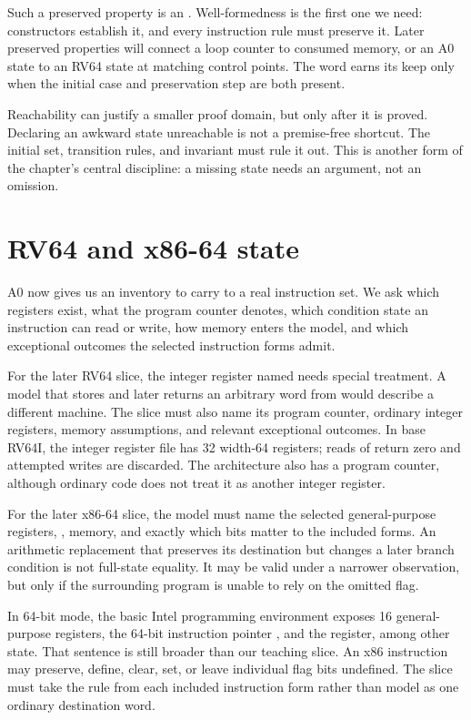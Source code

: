 Such a preserved property is an . Well-formedness is the first one
we need: constructors establish it, and every instruction rule must preserve
it. Later preserved properties will connect a loop counter to consumed memory, or an A0
state to an RV64 state at matching control points. The word earns its keep
only when the initial case and preservation step are both present.

Reachability can justify a smaller proof domain, but only after it is proved.
Declaring an awkward state unreachable is not a premise-free shortcut. The
initial set, transition rules, and invariant must rule it out. This is another
form of the chapter's central discipline: a missing state needs an argument,
not an omission.

\section{RV64 and x86-64 state}
\label{sec:paired-state}

A0 now gives us an inventory to carry to a real instruction set. We ask which
registers exist, what the program counter denotes, which condition state an
instruction can read or write, how memory enters the model, and which
exceptional outcomes the selected instruction forms admit.

For the later RV64 slice, the integer register named  needs special
treatment. A model that stores and later returns an arbitrary word from
 would describe a different machine. The slice must also name its
program counter, ordinary integer registers, memory assumptions, and relevant
exceptional outcomes. In base RV64I, the integer register file has 32
width-64 registers; reads of  return zero and attempted writes are
discarded. The architecture also has a program counter, although
ordinary code does not treat it as another integer register.\autocite{riscv2026unpriv}

For the later x86-64 slice, the model must name the selected general-purpose
registers, , memory, and exactly which  bits matter to
the included forms. An arithmetic replacement that preserves its destination
but changes a later branch condition is not full-state equality. It may be
valid under a narrower observation, but only if the surrounding program is
unable to rely on the omitted flag.

In 64-bit mode, the basic Intel programming environment exposes 16
general-purpose registers, the 64-bit instruction pointer , and the
 register, among other state. That sentence is still broader than
our teaching slice. An x86 instruction may preserve, define, clear, set, or
leave individual flag bits undefined. The slice must take the rule from each
included instruction form rather than model  as one ordinary
destination word.\autocite{intel2026sdm1,intel2026sdm2}

